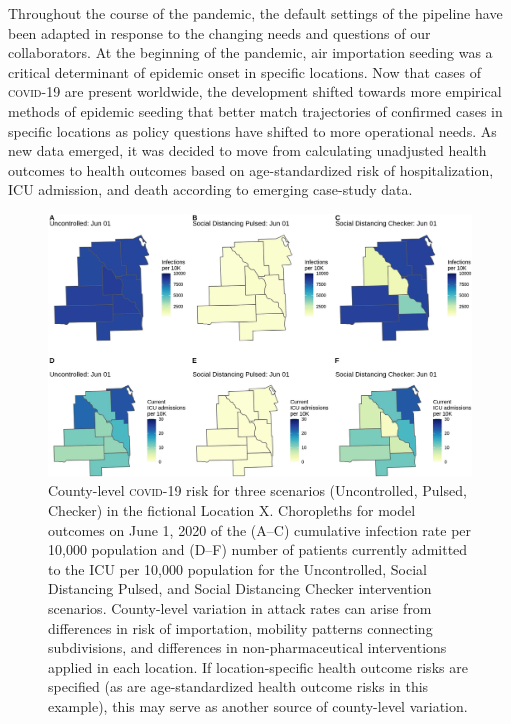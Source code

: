 Throughout the course of the pandemic, the default settings of the pipeline have been adapted in response to the changing needs and questions of our collaborators. At the beginning of the pandemic, air importation seeding was a critical determinant of epidemic onset in specific locations. Now that cases of \textsc{covid}-19 are present worldwide, the development shifted towards more empirical methods of epidemic seeding that better match trajectories of confirmed cases in specific locations as policy questions have shifted to more operational needs. As new data emerged, it was decided to move from calculating unadjusted health outcomes to health outcomes based on age-standardized risk of hospitalization, ICU admission, and death according to emerging case-study data. 
\begin{figure}[!htb]%
    \centering
    \includegraphics{fig_pipeline/fig4a}
    \caption[County-level \textsc{covid}-19 risk for three scenarios]{County-level \textsc{covid}-19 risk for three scenarios (Uncontrolled, Pulsed, Checker) in the fictional Location X. Choropleths for model outcomes on June 1, 2020 of the (A–C) cumulative infection rate per 10,000 population and (D–F) number of patients currently admitted to the ICU per 10,000 population for the Uncontrolled, Social Distancing Pulsed, and Social Distancing Checker intervention scenarios. County-level variation in attack rates can arise from differences in risk of importation, mobility patterns connecting subdivisions, and differences in non-pharmaceutical interventions applied in each location. If location-specific health outcome risks are specified (as are age-standardized health outcome risks in this example), this may serve as another source of county-level variation.}
    \label{fig:pipeline-map}
\end{figure}
